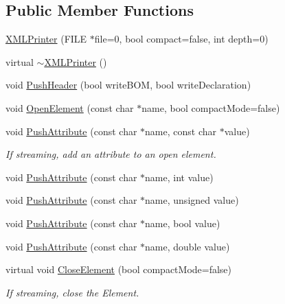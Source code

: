 \subsection*{Public Member Functions}
\begin{DoxyCompactItemize}
\item 
\hyperlink{classtinyxml2_1_1_x_m_l_printer_aa6d3841c069085f5b8a27bc7103c04f7}{X\+M\+L\+Printer} (F\+I\+L\+E $\ast$file=0, bool compact=false, int depth=0)
\item 
virtual \hyperlink{classtinyxml2_1_1_x_m_l_printer_af4caefa48ea6436898fb1807de8d14c0}{$\sim$\+X\+M\+L\+Printer} ()
\item 
void \hyperlink{classtinyxml2_1_1_x_m_l_printer_a178c608ce8476043d5d6513819cde903}{Push\+Header} (bool write\+B\+O\+M, bool write\+Declaration)
\item 
void \hyperlink{classtinyxml2_1_1_x_m_l_printer_a20fb06c83bd13e5140d7dd13af06c010}{Open\+Element} (const char $\ast$name, bool compact\+Mode=false)
\item 
void \hyperlink{classtinyxml2_1_1_x_m_l_printer_a9a4e2c9348b42e147629d5a99f4af3f0}{Push\+Attribute} (const char $\ast$name, const char $\ast$value)
\begin{DoxyCompactList}\small\item\em If streaming, add an attribute to an open element. \end{DoxyCompactList}\item 
void \hyperlink{classtinyxml2_1_1_x_m_l_printer_a69120c82088597372d28d0a98f2ee7a1}{Push\+Attribute} (const char $\ast$name, int value)
\item 
void \hyperlink{classtinyxml2_1_1_x_m_l_printer_aa41039e51990aaf5342f3e0575a692c4}{Push\+Attribute} (const char $\ast$name, unsigned value)
\item 
void \hyperlink{classtinyxml2_1_1_x_m_l_printer_a51f7950d7b7a19f0d3a0d549a318d45f}{Push\+Attribute} (const char $\ast$name, bool value)
\item 
void \hyperlink{classtinyxml2_1_1_x_m_l_printer_a1714867af40e68ca404c3e84b6cac2a6}{Push\+Attribute} (const char $\ast$name, double value)
\item 
virtual void \hyperlink{classtinyxml2_1_1_x_m_l_printer_af1fb439e5d800999646f333fa2f0699a}{Close\+Element} (bool compact\+Mode=false)
\begin{DoxyCompactList}\small\item\em If streaming, close the Element. \end{DoxyCompactList}\item 

\end{DoxyCompactItemize}
